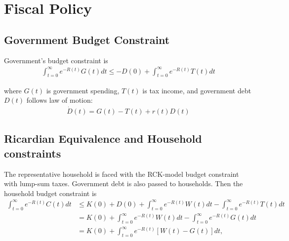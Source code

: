 \documentclass[main.tex]{subfiles}
\begin{document}
    
    \chapter{Fiscal Policy}
       
    \section{Government Budget Constraint}
        Government's budget constraint is
        \begin{align}
            \int_{t=0}^\infty e^{-R(t)} G(t) dt 
            \le
            - D(0) + \int_{t=0}^\infty e^{-R(t)} T(t) dt
            \label{eqn:gov-budget}
        \end{align}
        
        where $G(t)$ is government spending, $T(t)$ is tax income, and government debt $D(t)$ follows law of motion:
        \begin{align}
            \dot D(t) = G(t) - T(t) + r(t) D(t)
        \end{align}
        
        \section{Ricardian Equivalence and Household constraints}
        The representative household is faced with the RCK-model budget constraint with lump-sum taxes. Government debt is also passed to households. Then the household budget constraint is
        \begin{align}
            \int_{t=0}^\infty e^{-R(t)} C(t) dt 
            & \le
            K(0) + D(0) + 
            \int_{t=0}^\infty e^{-R(t)} W(t) dt
            -
            \int_{t=0}^\infty e^{-R(t)}  T(t) dt
            \\
            &=
            K(0) + 
            \int_{t=0}^\infty e^{-R(t)} W(t) dt
            -
            \int_{t=0}^\infty e^{-R(t)} G(t) dt
            \\
            &=
            K(0) + 
            \int_{t=0}^\infty e^{-R(t)} [W(t) - G(t)] dt,
        \end{align}
        
\end{document}
